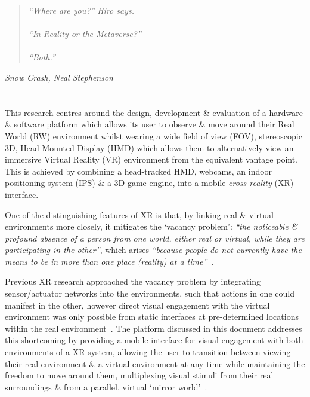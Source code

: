 \begin{quote}
\textit{``Where are you?'' Hiro says.
\\
\\
``In Reality or the Metaverse?''
\\
\\
``Both.''}
\end{quote}
\hfill \textit{Snow Crash, Neal Stephenson}
\\
\\
\\



This research centres around the design, development \& evaluation of a hardware \& software platform which allows its user to observe \& move around their Real World (RW) environment whilst wearing a wide field of view (FOV), stereoscopic 3D, Head Mounted Display (HMD) which allows them to alternatively view an immersive Virtual Reality (VR) environment from the equivalent vantage point. This is achieved by combining a head-tracked HMD, webcams, an indoor positioning system (IPS) \& a 3D game engine, into a mobile \textit{cross reality} (XR) interface.

One of the distinguishing features of XR is that, by linking real \& virtual environments more closely, it mitigates the `vacancy problem': \textit{``the noticeable \& profound absence of a person from one world, either real or virtual, while they are participating in the other''}, which arises \textit{``because people do not currently have the means to be in more than one place (reality) at a time''}~\cite{Lifton2007a}.

Previous XR research approached the vacancy problem by integrating sensor/actuator networks into the environments, such that actions in one could manifest in the other, however direct visual engagement with the virtual environment was only possible from static interfaces at pre-determined locations within the real environment~\cite{Lifton2007a, Dublon2011}. The platform discussed in this document addresses this shortcoming by providing a mobile interface for visual engagement with both environments of a XR system, allowing the user to transition between viewing their real environment \& a virtual environment at any time while maintaining the freedom to move around them, multiplexing visual stimuli from their real surroundings \& from a parallel, virtual `mirror world'~\cite{Gelernter1993}.

